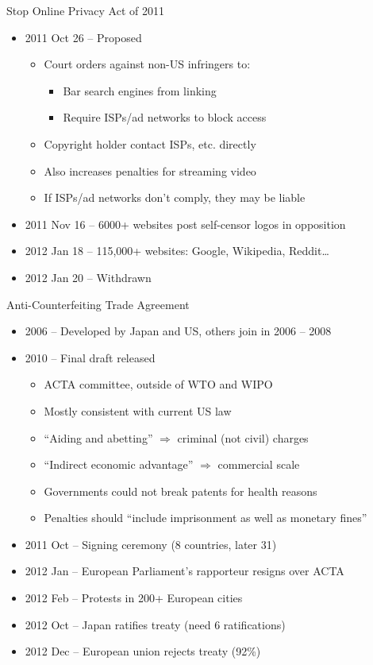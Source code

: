 \documentclass{beamer}
\begin{document}
\begin{frame}{Stop Online Privacy Act of 2011}
\pause
\begin{itemize}
\item 2011 Oct 26 -- Proposed
\begin{itemize}
\item Court orders against non-US infringers to:
\begin{itemize}
\item Bar search engines from linking
\item Require ISPs/ad networks to block access
\end{itemize}
\item Copyright holder contact ISPs, etc. directly
\item Also increases penalties for streaming video
\item If ISPs/ad networks don't comply, they may be liable
\end{itemize}
\item 2011 Nov 16 -- 6000+ websites post self-censor logos in opposition
\item 2012 Jan 18 -- 115,000+ websites: Google, Wikipedia, Reddit\ldots
\item 2012 Jan 20 -- Withdrawn
\end{itemize}
\end{frame}

\begin{frame}{Anti-Counterfeiting Trade Agreement}
\pause
\begin{itemize}
\item 2006 -- Developed by Japan and US, others join in 2006 -- 2008
\item 2010 -- Final draft released
\begin{itemize}
\item ACTA committee, outside of WTO and WIPO
\item Mostly consistent with current US law
\item ``Aiding and abetting'' $\Rightarrow$ criminal (not civil) charges
\item ``Indirect economic advantage'' $\Rightarrow$ commercial scale
\item Governments could not break patents for health reasons
\item Penalties should ``include imprisonment as well as monetary fines''
\end{itemize}
\item 2011 Oct -- Signing ceremony (8 countries, later 31)
\item 2012 Jan -- European Parliament's rapporteur resigns over ACTA
\item 2012 Feb -- Protests in 200+ European cities
\item 2012 Oct -- Japan ratifies treaty (need 6 ratifications)
\item 2012 Dec -- European union rejects treaty (92\%)
\end{itemize}
\end{frame}
\end{document}
